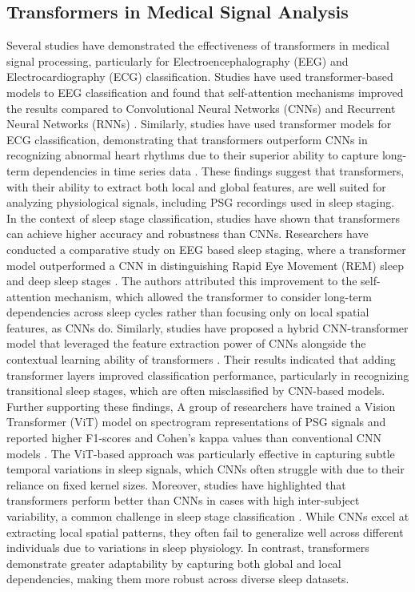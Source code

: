 \subsection{Transformers in Medical Signal Analysis}

Several studies have demonstrated the effectiveness of transformers in medical signal processing, particularly for Electroencephalography (EEG) and Electrocardiography (ECG) classification. Studies have used  transformer-based models to EEG classification and found that self-attention mechanisms improved the results compared to Convolutional Neural Networks (CNNs) and Recurrent Neural Networks (RNNs) \parencite{UnknownAuthor2024}. Similarly, studies have used transformer models for ECG classification, demonstrating that transformers outperform CNNs in recognizing abnormal heart rhythms due to their superior ability to capture long-term dependencies in time series data \parencite{krishna2024enhanced}. These findings suggest that transformers, with their ability to extract both local and global features, are well suited for analyzing physiological signals, including PSG recordings used in sleep staging. \\

In the context of sleep stage classification, studies have shown that transformers can achieve higher accuracy and robustness than CNNs. Researchers have conducted a comparative study on EEG based sleep staging, where a transformer model outperformed a CNN in distinguishing Rapid Eye Movement (REM) sleep and deep sleep stages \parencite{thuwajit2021eegwavenet}. The authors attributed this improvement to the self-attention mechanism, which allowed the transformer to consider long-term dependencies across sleep cycles rather than focusing only on local spatial features, as CNNs do. Similarly, studies have proposed a hybrid CNN-transformer model that leveraged the feature extraction power of CNNs alongside the contextual learning ability of transformers \parencite{yao2023cnn}. Their results indicated that adding transformer layers improved classification performance, particularly in recognizing transitional sleep stages, which are often misclassified by CNN-based models. \\

Further supporting these findings, A group of researchers have trained a Vision Transformer (ViT) model on spectrogram representations of PSG signals and reported higher F1-scores and Cohen’s kappa values than conventional CNN models \parencite{kurniawanvision}. The ViT-based approach was particularly effective in capturing subtle temporal variations in sleep signals, which CNNs often struggle with due to their reliance on fixed kernel sizes. Moreover, studies have highlighted that transformers perform better than CNNs in cases with high inter-subject variability, a common challenge in sleep stage classification \parencite{guo2024flexsleeptransformer}. While CNNs excel at extracting local spatial patterns, they often fail to generalize well across different individuals due to variations in sleep physiology. In contrast, transformers demonstrate greater adaptability by capturing both global and local dependencies, making them more robust across diverse sleep datasets.\\

